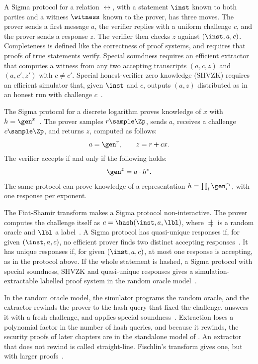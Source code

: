 A Sigma protocol for a relation $\rel$, with a statement $\inst$ known to both
parties and a witness $\witness$ known to the prover, has three moves. The prover sends a first
message $a$, the verifier replies with a uniform challenge $c$, and the prover
sends a response $z$. The verifier then checks $z$ against $(\inst, a, c)$.
Completeness is defined like the correctness of proof systems, and requires that
proofs of true statements verify. Special soundness
requires an efficient extractor that computes a witness from any two accepting
transcripts $(a, c, z)$ and $(a, c', z')$ with $c \neq c'$. Special
honest-verifier zero knowledge (SHVZK) requires an efficient simulator that,
given $\inst$ and $c$, outputs $(a, z)$ distributed as in an honest run with
challenge $c$~\cite{Damgard10sigma,C:CraDamSch94}.

The Sigma protocol for a discrete logarithm proves
knowledge of $x$ with $h = \gen^x$~\cite{JC:Schnorr91}.
The prover samples $r \sample \Zp$, sends $a$, receives a challenge $c
\sample \Zp$, and returns $z$, computed as follows:
%
\begin{equation*}
%
  a = \gen^r, \qquad z = r + cx.
%
\end{equation*}
%
The verifier accepts if and only if the following holds:
%
\begin{equation*}
%
  \gen^z = a \cdot h^c.
%
\end{equation*}
%
The same protocol can prove knowledge of a representation $h = \prod_i
\gen_i^{x_i}$, with one response per exponent.

The Fiat-Shamir transform makes a Sigma protocol non-interactive. The prover
computes the challenge itself as $c = \hash(\inst, a, \lbl)$, where $\hash$ is a
random oracle and $\lbl$ a label~\cite{C:FiaSha86}. A Sigma protocol has
quasi-unique responses if, for given $(\inst, a, c)$, no efficient prover finds
two distinct accepting responses~\cite{INDOCRYPT:FKMV12}. It has unique responses if, for given $(\inst,
a, c)$, at most one response is accepting, as in the protocol above. If the
whole statement is hashed, a Sigma protocol with special soundness, SHVZK and
quasi-unique responses gives a simulation-extractable labelled proof system in
the random oracle model~\cite{INDOCRYPT:FKMV12}.

In the random oracle model, the simulator programs the random oracle, and the
extractor rewinds the prover to the hash query that fixed the challenge,
answers it with a fresh challenge, and applies special
soundness~\cite{CCS:BelRog93,INDOCRYPT:FKMV12,JC:PoiSte00}. Extraction loses a
polynomial factor in the number of hash queries, and because it rewinds, the
security proofs of later chapters are in the standalone model of
. An extractor that does not rewind is called
straight-line. Fischlin's transform gives one, but with larger
proofs~\cite{C:Fischlin05}.